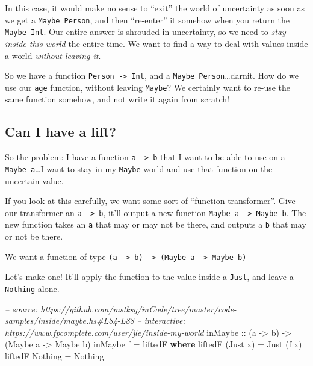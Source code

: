 \documentclass[]{article}
\newenvironment{Shaded}{}{}
\newcommand{\KeywordTok}[1]{\textcolor[rgb]{0.00,0.44,0.13}{\textbf{#1}}}
\newcommand{\DataTypeTok}[1]{\textcolor[rgb]{0.56,0.13,0.00}{#1}}
\newcommand{\CommentTok}[1]{\textcolor[rgb]{0.38,0.63,0.69}{\textit{#1}}}
\newcommand{\OtherTok}[1]{\textcolor[rgb]{0.00,0.44,0.13}{#1}}
\newcommand{\FunctionTok}[1]{\textcolor[rgb]{0.02,0.16,0.49}{#1}}
\newcommand{\NormalTok}[1]{#1}
\begin{document}
In this case, it would make no sense to ``exit'' the world of uncertainty as
soon as we get a \texttt{Maybe\ Person}, and then ``re-enter'' it somehow when
you return the \texttt{Maybe\ Int}. Our entire answer is shrouded in
uncertainty, so we need to \emph{stay inside this world} the entire time. We
want to find a way to deal with values inside a world \emph{without leaving it}.

So we have a function \texttt{Person\ -\textgreater{}\ Int}, and a
\texttt{Maybe\ Person}\ldots{}darnit. How do we use our \texttt{age} function,
without leaving \texttt{Maybe}? We certainly want to re-use the same function
somehow, and not write it again from scratch!

\subsection{Can I have a lift?}\label{can-i-have-a-lift}

So the problem: I have a function \texttt{a\ -\textgreater{}\ b} that I want to
be able to use on a \texttt{Maybe\ a}\ldots{}I want to stay in my \texttt{Maybe}
world and use that function on the uncertain value.

If you look at this carefully, we want some sort of ``function transformer''.
Give our transformer an \texttt{a\ -\textgreater{}\ b}, it'll output a new
function \texttt{Maybe\ a\ -\textgreater{}\ Maybe\ b}. The new function takes an
\texttt{a} that may or may not be there, and outputs a \texttt{b} that may or
not be there.

We want a function of type
\texttt{(a\ -\textgreater{}\ b)\ -\textgreater{}\ (Maybe\ a\ -\textgreater{}\ Maybe\ b)}

Let's make one! It'll apply the function to the value inside a \texttt{Just},
and leave a \texttt{Nothing} alone.

\begin{Shaded}
\begin{Highlighting}[]
\CommentTok{-- source: https://github.com/mstksg/inCode/tree/master/code-samples/inside/maybe.hs#L84-L88}
\CommentTok{-- interactive: https://www.fpcomplete.com/user/jle/inside-my-world}
\OtherTok{inMaybe ::}\NormalTok{ (a }\OtherTok{->}\NormalTok{ b) }\OtherTok{->}\NormalTok{ (}\DataTypeTok{Maybe}\NormalTok{ a }\OtherTok{->} \DataTypeTok{Maybe}\NormalTok{ b)}
\NormalTok{inMaybe f }\FunctionTok{=}\NormalTok{ liftedF}
  \KeywordTok{where}
\NormalTok{    liftedF (}\DataTypeTok{Just}\NormalTok{ x) }\FunctionTok{=} \DataTypeTok{Just}\NormalTok{ (f x)}
\NormalTok{    liftedF }\DataTypeTok{Nothing}  \FunctionTok{=} \DataTypeTok{Nothing}
\end{Highlighting}
\end{Shaded}
\end{document}
